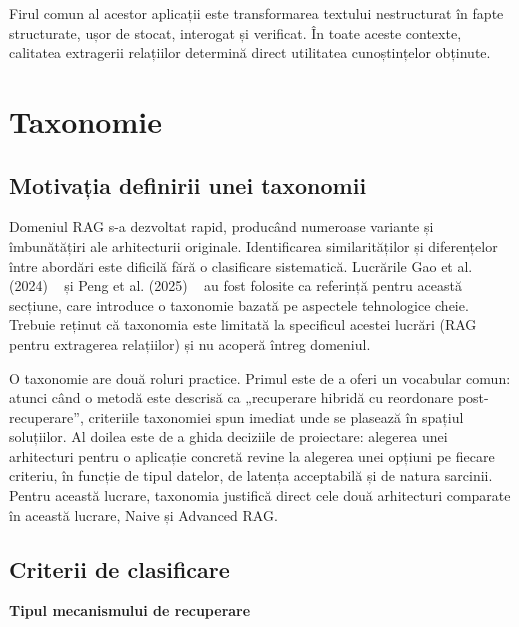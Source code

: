 Firul comun al acestor aplicații este transformarea textului nestructurat în fapte structurate, ușor de stocat, interogat și verificat. În toate aceste contexte, calitatea extragerii relațiilor determină direct utilitatea cunoștințelor obținute.

\section{Taxonomie}
\label{sec:taxonomie}

\subsection{Motivația definirii unei taxonomii}

Domeniul RAG s-a dezvoltat rapid, producând numeroase variante și îmbunătățiri ale arhitecturii originale. Identificarea similarităților și diferențelor între abordări este dificilă fără o clasificare sistematică. Lucrările Gao et al. (2024) ~\cite{gao2024retrievalaugmentedgenerationlargelanguage} și Peng et al. (2025) ~\cite{peng2025graph} au fost folosite ca referință pentru această secțiune, care introduce o taxonomie bazată pe aspectele tehnologice cheie. Trebuie reținut că taxonomia este limitată la specificul acestei lucrări (RAG pentru extragerea relațiilor) și nu acoperă întreg domeniul.

O taxonomie are două roluri practice. Primul este de a oferi un vocabular comun: atunci când o metodă este descrisă ca „recuperare hibridă cu reordonare post-recuperare”, criteriile taxonomiei spun imediat unde se plasează în spațiul soluțiilor. Al doilea este de a ghida deciziile de proiectare: alegerea unei arhitecturi pentru o aplicație concretă revine la alegerea unei opțiuni pe fiecare criteriu, în funcție de tipul datelor, de latența acceptabilă și de natura sarcinii. Pentru această lucrare, taxonomia justifică direct cele două arhitecturi comparate în această lucrare, Naive și Advanced RAG.

\subsection{Criterii de clasificare}

\textbf{Tipul mecanismului de recuperare}

